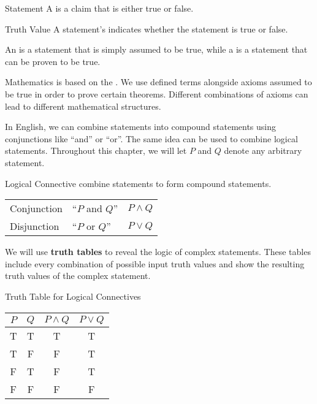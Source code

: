 \documentclass[letterpaper,12pt]{report}
\begin{document}
\begin{dfnbox}{Statement}{}
    A  is a claim that is either true or false.
\end{dfnbox}

\begin{dfnbox}{Truth Value}{}
	A statement's  indicates whether the statement is true or false.
\end{dfnbox}

An  is a statement that is simply assumed to be true, while a  is a statement that can be proven to be true.

Mathematics is based on the . We use defined terms alongside axioms assumed to be true in order to prove certain theorems. Different combinations of axioms can lead to different mathematical structures.

In English, we can combine statements into compound statements using conjunctions like ``and'' or ``or''. The same idea can be used to combine logical statements. Throughout this chapter, we will let $P$ and $Q$ denote any arbitrary statement.

\begin{dfnbox}{Logical Connective}{}
	 combine statements to form compound statements.
	\tcblower
    \begin{center}\begin{tabular}{lll}
        Conjunction & ``$P$ and $Q$'' & $P \land Q$ \\
        Disjunction & ``$P$ or $Q$'' & $P \lor Q$ \\
    \end{tabular}\end{center}
\end{dfnbox}

We will use \textbf{truth tables} to reveal the logic of complex statements. These tables include every combination of possible input truth values and show the resulting truth values of the complex statement.

\begin{exbox}{Truth Table for Logical Connectives}{}
	\begin{center}
		\begin{tabular}{c|c||c|c}
			$P$ & $Q$ & $P \land Q$ & $P \lor Q$ \\ \hline
			T & T & T & T \\
			T & F & F & T \\
			F & T & F & T \\
			F & F & F & F \\
		\end{tabular}
	\end{center}
\end{exbox}
\end{document}
